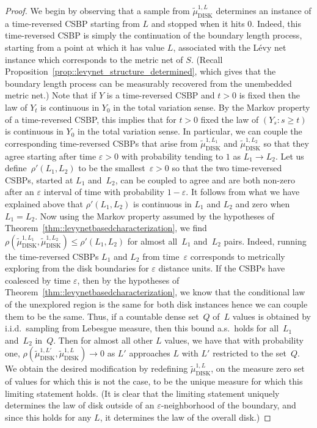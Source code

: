 \documentclass[10pt]{amsart}
\let\epsilon\varepsilon
\theoremstyle{plain}
\numberwithin{theorem}{section}
\theoremstyle{definition}
\newcommand{\tmudonel}{\wt{\mu}_{ \mathrm{DISK}}^{1, L}}
\def\tmudonelset#1{\wt{\mu}_{ \mathrm{DISK}}^{1, #1}}
\let\wt\widetilde
\begin{document}
\begin{proof}
We begin by observing that a sample from $\tmudonel$ determines an instance of a time-reversed CSBP starting from $L$ and stopped when it hits $0$. Indeed, this time-reversed CSBP is simply the continuation of the boundary length process, starting from a point at which it has value $L$, associated with the Lévy net instance which corresponds to the metric net of $S$. (Recall Proposition~\ref{prop::levynet_structure_determined}, which gives that the boundary length process can be measurably recovered from the unembedded metric net.) Note that if $Y$ is a time-reversed CSBP and $t > 0$ is fixed then the law of $Y_t$ is continuous in $Y_0$ in the total variation sense. By the Markov property of a time-reversed CSBP, this implies that for $t > 0$ fixed the law of $(Y_s : s \geq t)$ is continuous in $Y_0$ in the total variation sense. In particular, we can couple the corresponding time-reversed CSBPs that arise from $\tmudonelset{L_1}$ and $\tmudonelset{L_2}$ so that they agree starting after time $\epsilon > 0$ with probability tending to $1$ as $L_1 \to L_2$. Let us define~$\rho'(L_1, L_2)$ to be the smallest~$\epsilon > 0$ so that the two time-reversed CSBPs, started at $L_1$ and~$L_2$, can be coupled to agree and are both non-zero after an $\epsilon$ interval of time with probability $1-\epsilon$. It follows from what we have explained above that $\rho'(L_1, L_2)$ is continuous in $L_1$ and $L_2$ and zero when $L_1 = L_2$. Now using the Markov property assumed by the hypotheses of Theorem~\ref{thm::levynetbasedcharacterization}, we find $\rho(\tmudonelset{L_1}, \tmudonelset{L_2}) \leq \rho'(L_1, L_2)$ for almost all~$L_1$ and~$L_2$ pairs. Indeed, running the time-reversed CSBPs $L_1$ and $L_2$ from time~$\epsilon$ corresponds to metrically exploring from the disk boundaries for $\epsilon$ distance units. If the CSBPs have coalesced by time $\epsilon$, then by the hypotheses of Theorem~\ref{thm::levynetbasedcharacterization}, we know that the conditional law of the unexplored region is the same for both disk instances hence we can couple them to be the same. Thus, if a countable dense set~$Q$ of~$L$ values is obtained by i.i.d.\ sampling from Lebesgue measure, then this bound a.s.\ holds for all~$L_1$ and~$L_2$ in~$Q$. Then for almost all other $L$ values, we have that with probability one, $\rho(\tmudonelset{L'}, \tmudonelset{L}) \to 0$ as $L'$ approaches $L$ with $L'$ restricted to the set~$Q$. We obtain the desired modification by redefining $\tmudonelset{L}$, on the measure zero set of values for which this is not the case, to be the unique measure for which this limiting statement holds. (It is clear that the limiting statement uniquely determines the law of disk outside of an $\epsilon$-neighborhood of the boundary, and since this holds for any $L$, it determines the law of the overall disk.)
\end{proof}
\end{document}
